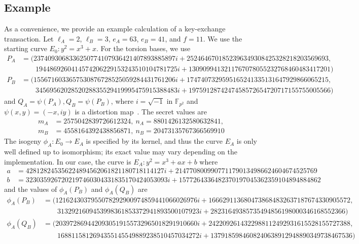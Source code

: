 \documentclass[envcountsect,envcountsame,runningheads]{llncs}   %
\newcommand{\FF}{{\mathbb{F}}}
\begin{document}
\subsection{Example}\label{sec:ex}

As a convenience, we provide an example calculation of a key-exchange
transaction. Let $\ell_A = 2$, $\ell_B = 3$, $e_A = 63$, $e_B = 41$,
and $f = 11$. We use the starting curve $E_0: y^2 = x^3 + x$. For the
torsion bases, we use {\tiny
\begin{align*}
P_A &= (2374093068336250774107936421407893885897 i + 
    2524646701852396349308425328218203569693, \\
    & \qquad 1944869260414574206229153243510104781725 i + 
    1309099413211767078055232768460483417201) \\
P_B &= (1556716033657530876728525059284431761206 i + 
    1747407329595165241335131647929866065215, \\
    & \qquad 3456956202852028835529419995475915388483 i + 
    1975912874247458572654720717155755005566)
\end{align*}
}
{\!\!\!} and $Q_A = \psi(P_A), Q_B = \psi(P_B)$, where $i = \sqrt{-1}$ in
$\FF_{p^2}$ and $\psi(x,y) = (-x,iy)$ is a distortion map~\cite{joux}. The
secret values are
{\tiny
\begin{align*}
m_A &= 2575042839726612324,\ 
n_A = 8801426132580632841,\  \\
m_B &= 4558164392438856871,\ 
n_B = 20473135767366569910 
\end{align*}
}
The isogeny $\phi_A\colon E_0 \to E_A$ is specified by its kernel, and
thus the curve $E_A$ is only well defined up to isomorphism; its exact
value may vary depending on the implementation. In our case, the curve
is $E_A: y^2 = x^3 + ax + b$ where
{\tiny
\begin{align*}
a &= 428128245356224894562061821180718114127 i + 2147708009907711790134986624604674525769 \\
b &= 3230359267202197460304331835170424053093 i + 1577264336482370197045362359104894884862
\end{align*}
}
and the values of $\phi_A(P_B)$ and $\phi_A(Q_B)$ are
{\tiny
\begin{align*}
\phi_A(P_B) &= 
(1216243037955078292900974859441066026976 i + 
    1666291136804738684832637187674330905572, \\
    & \qquad 3132921609453998361853372941893500107923 i + 
    28231649385735494856198000346168552366)
\\
\phi_A(Q_B) &=
(2039728694420930519155732965018291910660 i + 
    2422092614322988112492931615528155727388, \\
    & \qquad 1688115812694355145549889238510457034272 i + 
    1379185984608240638912948890349738467536)
\end{align*}
}
\end{document}
